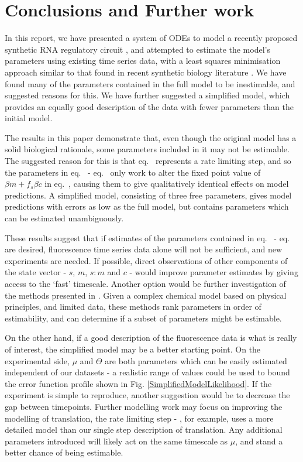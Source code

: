 \documentclass[10pt,journal]{./IEEE_latex_class/IEEEtran}
\renewcommand{\eqref}{eq.~\originaleqref}
\begin{document}
\section{Conclusions and Further work}
\label{Conclusions and Further work}

In this report, we have presented a system of ODEs to model a recently proposed synthetic RNA regulatory circuit \cite{Rodrigo2012}, and attempted to estimate the model's parameters using existing time series data, with a least squares minimisation approach similar to that found in recent synthetic biology literature \cite{Hu2015}. We have found many of the parameters contained in the full model to be inestimable, and suggested reasons for this. We have further suggested a simplified model, which provides an equally good description of the data with fewer parameters than the initial model.

The results in this paper demonstrate that, even though the original model has a solid biological rationale, some parameters included in it may not be estimable. The suggested reason for this is that \eqref{eq:p} represents a rate limiting step, and so the parameters in \eqref{eq:s} - \eqref{eq:c} only work to alter the fixed point value of $\beta m +f_{s}\beta c$ in \eqref{eq:p}, causing them to give qualitatively identical effects on model predictions. A simplified model, consisting of three free parameters, gives model predictions with errors as low as the full model, but contains parameters which can be estimated unambiguously.

These results suggest that if estimates of the parameters contained in \eqref{eq:s} - \eqref{eq:c} are desired, fluorescence time series data alone will not be sufficient, and new experiments are needed. If possible, direct observations of other components of the state vector - $s$, $m$, $s:m$ and $c$ - would improve parameter estimates by giving access to the `fast' timescale. Another option would be further investigation of the methods presented in \cite{Mclean2012,Yao2003,Mclean2012-2}. Given a complex chemical model based on physical principles, and limited data, these methods rank parameters in order of estimability, and can determine if a subset of parameters might be estimable.

On the other hand, if a good description of the fluorescence data is what is really of interest, the simplified model may be a better starting point. On the experimental side, $\mu$ and $\Theta$ are both parameters which can be easily estimated independent of our datasets - a realistic range of values could be used to bound the error function profile shown in Fig. \ref{SimplifiedModelLikelihood}. If the experiment is simple to reproduce, another suggestion would be to decrease the gap between timepoints. Further modelling work may focus on improving the modelling of translation, the rate limiting step - \cite{Hu2015}, for example, uses a more detailed model than our single step description of translation. Any additional parameters introduced will likely act on the same timescale as $\mu$, and stand a better chance of being estimable.
\end{document}
